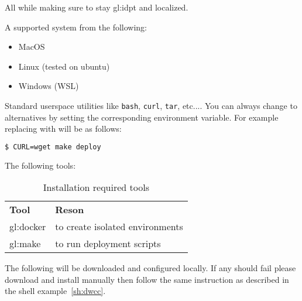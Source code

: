 All while making sure to stay \gls{gl:idpt} and localized.


A supported system from the following:

\begin{itemize}
  \item MacOS
  \item Linux (tested on ubuntu)
  \item Windows (WSL)
\end{itemize}

Standard userspace utilities like \lstinline[columns=fixed]{bash}, \lstinline[columns=fixed]{curl}, \lstinline[columns=fixed]{tar}, etc.... You can always change to alternatives by setting the corresponding environment variable. For example replacing  with  will be as follows:

\begin{lstlisting}[language=bash, caption={Deploy with custom command}, label={sh:dwcc}]
    $ CURL=wget make deploy
\end{lstlisting}

The following tools:

\begin{table}[H]
  \begin{center}
    \label{tab:irt}
    \def\arraystretch{1.5}
    \begin{tabularx}{\linewidth}{|l X |}
      \hline
      \rowcolor{gray!20}
      \textbf{Tool} & \textbf{Reson}\\
      \gls{gl:docker} & to create isolated environments\\
      \gls{gl:make} & to run deployment scripts\\
      \hline
    \end{tabularx}
    \caption{Installation required tools}
  \end{center}
\end{table}

\label{hdr:auto}

The following will be downloaded and configured locally. If any should fail please download and install manually then follow the same instruction as described in the shell example~\ref{sh:dwcc}.

